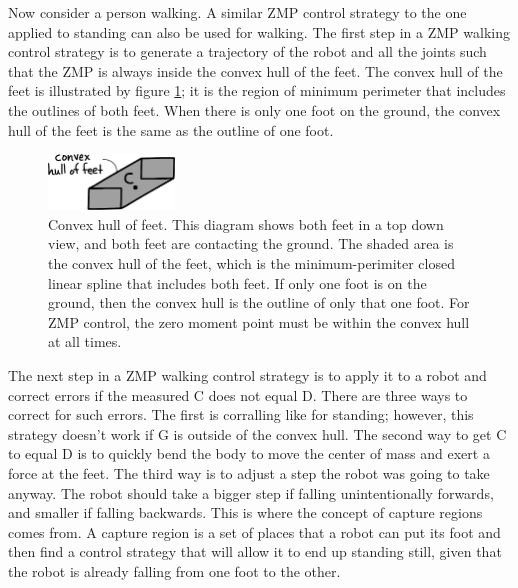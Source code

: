 Now consider a person walking. A similar ZMP control strategy to the one applied to standing can also be used for walking. The first step in a ZMP walking control strategy is to generate a trajectory of the robot and all the joints such that the ZMP is always inside the convex hull of the feet. The convex hull of the feet is illustrated by figure \ref{fig:ConvexHull}; it is the region of minimum perimeter that includes the outlines of both feet. When there is only one foot on the ground, the convex hull of the feet is the same as the outline of one foot. 

\begin{figure}[h]		%
\begin{centering}
\includegraphics[width=0.3\textwidth]{Figures/ConvexHull}\par
\end{centering}
\caption[Diagram: Convex Hull of Feet]{Convex hull of feet. This diagram shows both feet in a top down view, and both feet are contacting the ground. The shaded area is the convex hull of the feet, which is the minimum-perimiter closed linear spline that includes both feet. If only one foot is on the ground, then the convex hull is the outline of only that one foot. For ZMP control, the zero moment point must be within the convex hull at all times.}
\label{fig:ConvexHull}
\end{figure}
%

The next step in a ZMP walking control strategy is to apply it to a robot and correct errors if the measured C does not equal D. There are three ways to correct for such errors. The first is corralling like for standing; however, this strategy doesn't work if G is outside of the convex hull. The second way to get C to equal D is to quickly bend the body to move the center of mass and exert a force at the feet. The third way is to adjust a step the robot was going to take anyway. The robot should take a bigger step if falling unintentionally forwards, and smaller if falling backwards. This is where the concept of capture regions comes from. A capture region is a set of places that a robot can put its foot and then find a control strategy that will allow it to end up standing still, given that the robot is already falling from one foot to the other.


